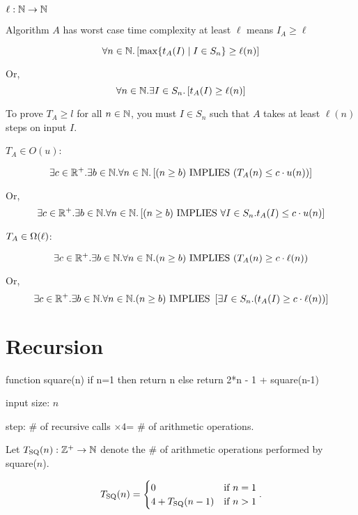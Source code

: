 \documentclass[11pt, cyan, night, 0.5in]{hw}
\begin{document}
$\ell:\mathbb{N}\to\mathbb{N}$

Algorithm $A$ has worst case time complexity at least $\ell$ means $I_A\geq \ell$

\[\forall n\in\mathbb{N}.\left[\max\{t_A(I)\mid I\in S_n\}\geq \ell(n)\right]\]

Or, \[\forall n\in\mathbb{N}. \mathbf{\exists} I\in S_n. \left[t_A(I)\geq \ell(n)\right]\]


To prove $T_A\geq l$ for all $n\in\mathbb{N}$, you must  $I\in S_n$ such that $A$ takes at least $\ell(n)$ steps on input $I$. 

\np

$T_A\in O(u)$:

\[\exists c\in\mathbb{R}^+. \exists b\in\mathbb{N}.\forall n\in\mathbb{N}. \left[(n\geq b)\,\,\mathrm{IMPLIES}\,\, (T_A(n)\leq c\cdot u(n))\right]\]

Or, \[\exists c\in\mathbb{R}^+.\exists b\in\mathbb{N}.\forall n\in\mathbb{N}.\left[(n\geq b)\,\,\mathrm{IMPLIES}\,\, \forall I\in S_n. t_A(I)\leq c\cdot u(n)\right]\]

$T_A\in\Omega(\ell)$:

\[\exists c\in\mathbb{R}^+.\exists b\in\mathbb{N}.\forall n\in\mathbb{N}. (n\geq b)\,\,\mathrm{IMPLIES}\,\, (T_A(n)\geq c\cdot \ell(n))\]

Or, \[\exists c\in\mathbb{R}^+. \exists b\in\mathbb{N}. \forall n\in\mathbb{N}. (n\geq b)\,\,\mathrm{IMPLIES}\,\, \left[\exists I\in S_n. (t_A(I)\geq c\cdot \ell(n))\right]\]

\np

\section{Recursion}

\begin{code}
function square(n)
if n=1
then return n
else return 2*n - 1 + square(n-1)
\end{code}

input size: $n$

step: \# of recursive calls $\times4$= \# of arithmetic operations.

Let $T_{\text{SQ}}(n):\mathbb{Z}^+\to\mathbb{N}$ denote the \# of arithmetic operations performed by square($n$).

\[T_{\text{SQ}}(n)=\begin{cases}
    0 & \text{if } n=1\\
    4+T_{\text{SQ}}(n-1) & \text{if } n>1
\end{cases}.\]
\end{document}
